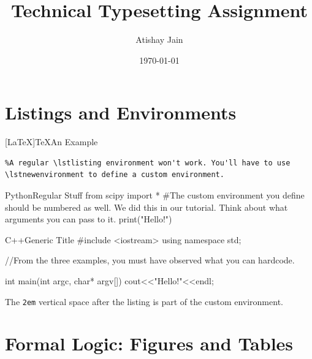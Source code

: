 \documentclass[]{article}
\title{Technical Typesetting Assignment}
\author{Atishay Jain}
\date{\today}
\theoremstyle{remark}
\begin{document}
\maketitle
\tableofcontents
\newpage
\section{Listings and Environments}

\begin{mylst}{[LaTeX]TeX}{An Example}
\begin{lstlisting}
%A regular \lstlisting environment won't work. You'll have to use \lstnewenvironment to define a custom environment.
\end{lstlisting}
\end{mylst}

\begin{mylst}{Python}{Regular Stuff}
from scipy import *
#The custom environment you define should be numbered as well. We did this in our tutorial. Think about what arguments you can pass to it.
print("Hello!")
\end{mylst}

\begin{mylst}{C++}{Generic Title}
#include <iostream>
using namespace std;

//From the three examples, you must have observed what you can hardcode.

int main(int argc, char* argv[])
{
    cout<<"Hello!"<<endl;
}
\end{mylst}

The \texttt{2em} vertical space after the listing is part of the custom environment.

\newpage

\section{Formal Logic: Figures and Tables}
\end{document}
